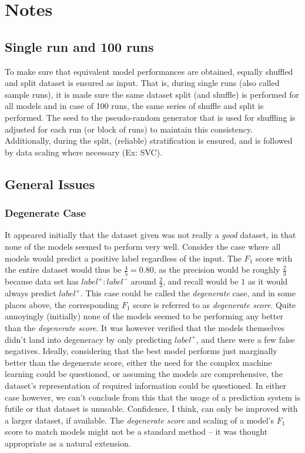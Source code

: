 \documentclass{article}
\begin{document}
	\section{Notes}
	
	\subsection{Single run and 100 runs} \label{types_of_runs}
	To make sure that equivalent model performances are obtained, equally shuffled and split dataset is ensured as input. That is, during single runs (also called sample runs), it is made sure the same dataset split (and shuffle) is performed for all models and in case of 100 runs, the same series of shuffle and split is performed. The seed to the pseudo-random generator that is used for shuffling is adjusted for each run (or block of runs) to maintain this consistency. Additionally, during the split, (reliable) stratification is ensured, and is followed by data scaling where necessary (Ex: SVC).
	
	\subsection{General Issues} \label{general_issues}
	
	\subsubsection{Degenerate Case}
	It appeared initially that the dataset given was not really a \emph{good} dataset, in that none of the models seemed to perform very well. Consider the case where all models would predict a positive label regardless of the input. The $F_1$ score with the entire dataset would thus be $\frac{4}{5} = 0.80$, as the precision would be roughly $\frac{2}{3}$ because data set has $label^+:label^-$ around $\frac{2}{3}$, and recall would be $1$ as it would always predict $label^+$. This case could be called the \emph{degenerate} case, and in some places above, the corresponding $F_1$ score is referred to as \emph{degenerate score}. Quite annoyingly (initially) none of the models seemed to be performing any better than the \emph{degenerate score}. It was however verified that the models themselves didn't land into degeneracy by only predicting $label^+$, and there were a few false negatives. Ideally, considering that the best model performs just marginally better than the degenerate score, either the need for the complex machine learning could be questioned, or assuming the models are comprehensive, the dataset's representation of required information could be questioned. In either case however, we can't conclude from this that the usage of a prediction system is futile or that dataset is unusable. Confidence, I think, can only be improved with a larger dataset, if available. The \emph{degenerate score} and scaling of a model's $F_1$ score to match models might not be a standard method -- it was thought appropriate as a natural extension.
	
\end{document}
